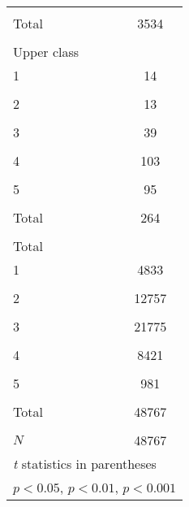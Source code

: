 {\begin{tabular}{l*{1}{c}}
            &                     \\
[1em]
Total       &        3534         \\
            &                     \\
\hline
Upper class &                     \\
1           &          14         \\
            &                     \\
[1em]
2           &          13         \\
            &                     \\
[1em]
3           &          39         \\
            &                     \\
[1em]
4           &         103         \\
            &                     \\
[1em]
5           &          95         \\
            &                     \\
[1em]
Total       &         264         \\
            &                     \\
\hline
Total       &                     \\
1           &        4833         \\
            &                     \\
[1em]
2           &       12757         \\
            &                     \\
[1em]
3           &       21775         \\
            &                     \\
[1em]
4           &        8421         \\
            &                     \\
[1em]
5           &         981         \\
            &                     \\
[1em]
Total       &       48767         \\
            &                     \\
\hline
\(N\)       &       48767         \\
\hline\hline
\multicolumn{2}{l}{\footnotesize \textit{t} statistics in parentheses}\\
\multicolumn{2}{l}{\footnotesize \sym{*} \(p<0.05\), \sym{**} \(p<0.01\), \sym{***} \(p<0.001\)}\\
\end{tabular}
}
